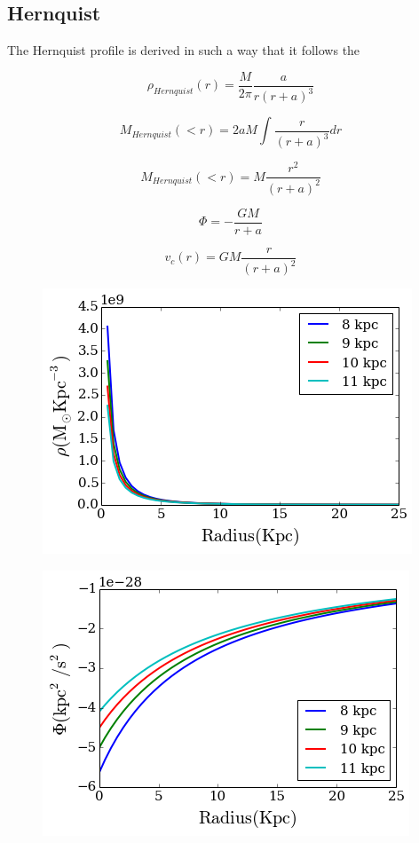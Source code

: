 \documentclass[a4paper, 12pt]{article} %
\begin{document}
\subsection{Hernquist}

The Hernquist profile is derived in such a way that it follows the 

\begin{equation}
\rho_{Hernquist}(r) =  \frac{M}{2\pi} \frac{a}{r(r+a)^3}
\end{equation}

\begin{equation}
M_{Hernquist}(<r) = 2aM \int \frac{r}{(r+a)^3}dr
\end{equation}

\begin{equation}
M_{Hernquist}(<r) = M \frac{r^2}{(r+a)^2}
\end{equation}

\begin{equation}
\Phi = - \frac{GM}{r+a}
\end{equation}

\begin{equation}
v_c(r) = GM \frac{r}{(r+a)^2}
\end{equation}

\begin{figure}[H]
\centering
\includegraphics[scale=0.7]{hern_density.png}
\end{figure}

\begin{figure}[H]
\centering
\includegraphics[scale=0.7]{hern_potential.png}
\end{figure}
\end{document}
